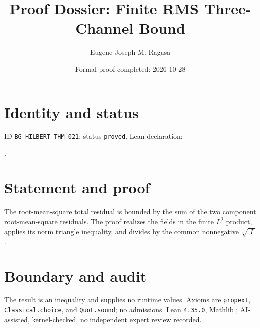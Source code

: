 \documentclass[11pt]{article}
\title{Proof Dossier: Finite RMS Three-Channel Bound}\author{Eugene Joseph M. Ragasa}\date{Formal proof completed: 2026-10-28}
\begin{document}
\raggedright\maketitle
\section{Identity and status}
ID \texttt{BG-HILBERT-THM-021}; status \texttt{proved}. Lean declaration:
\par{}.
\section{Statement and proof}
The root-mean-square total residual is bounded by the sum of the two component root-mean-square residuals. The proof realizes the fields in the finite $L^2$ product, applies its norm triangle inequality, and divides by the common nonnegative $\sqrt{|I|}$.
\section{Boundary and audit}
The result is an inequality and supplies no runtime values. Axioms are \texttt{propext}, \texttt{Classical.choice}, and \texttt{Quot.sound}; no admissions. Lean \texttt{4.35.0}, Mathlib {\scriptsize{}}; AI-assisted, kernel-checked, no independent expert review recorded.
\end{document}
